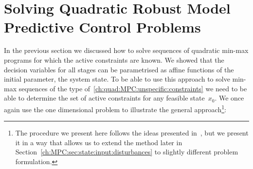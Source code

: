 \section{Solving Quadratic Robust Model Predictive Control Problems}\label{ch:MPC:sec:qMPC:line:search}
\resetforsection
\mysplit In the previous section we discussed how to solve sequences of quadratic min-max programs for which the active constraints are known.
%
We showed that the decision variables for all stages can be parametrised as affine functions of the initial parameter, the system state.
%
To be able to use this approach to solve min-max sequences of the type of~\eqref{ch:quad:MPC:unspecific:constraints} we need to be able to determine the set of active constraints for any feasible state~$x_0$.
%
We once again use the one dimensional problem to illustrate the general approach\footnote{
%
The procedure we present here follows the ideas presented in~\cite{Buerger:ACC,Buerger:Automatica,Buerger:2016}, but we present it in a way that allows us to extend the method later in Section~\ref{ch:MPC:sec:state:input:disturbances} to slightly different problem formulation.
}:
%
